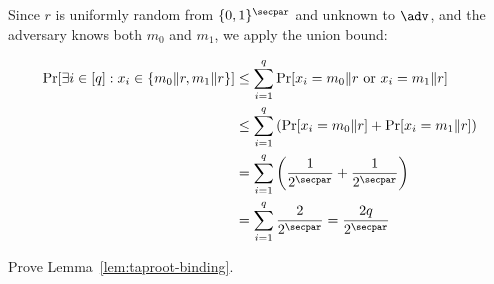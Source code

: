\begin{mysolution}
Since $r$ is uniformly random from $\{0,1\}^\secpar$ and unknown to $\adv$, and the adversary knows both $m_0$ and $m_1$, we apply the union bound:

\begin{align*}
  \Pr[\exists i \in [q] : x_i \in \{m_0 \| r, m_1 \| r\}] &\leq \sum_{i=1}^q \Pr[x_i = m_0 \| r \text{ or } x_i = m_1 \| r] \\
  &\leq \sum_{i=1}^q \left(\Pr[x_i = m_0 \| r] + \Pr[x_i = m_1 \| r]\right) \\
  &= \sum_{i=1}^q \left(\frac{1}{2^\secpar} + \frac{1}{2^\secpar}\right) \\
  &= \sum_{i=1}^q \frac{2}{2^\secpar} = \frac{2q}{2^\secpar}
\end{align*}
\end{mysolution}
\fi

\begin{exercise}
  Prove Lemma~\ref{lem:taproot-binding}.
\end{exercise}

